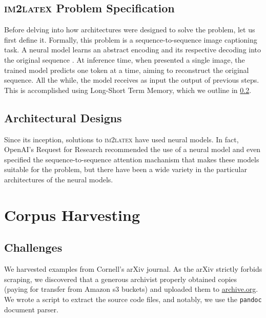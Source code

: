 \documentclass[12pt]{article}
\begin{document}
\cprotect
\subsection{\textsc{im2latex} Problem Specification}

Before delving into how architectures were designed to solve the problem, let us
first define it. Formally, this problem is a sequence-to-sequence image
captioning task. A neural model learns an abstract encoding and its respective
decoding into the original sequence \parencite[1]{deng2016you}. At inference
time, when presented a single image, the trained model predicts one token at a
time, aiming to reconstruct the original sequence. All the while, the model
receives as input the output of previous steps. This is accomplished using
Long-Short Term Memory, which we outline in \ref{netarch}.

\subsection{Architectural Designs}
\label{netarch}

Since its inception, solutions to \textsc{im2latex} have used neural models. In
fact, OpenAI's Request for Research recommended the use of a neural model and
even specified the sequence-to-sequence attention machanism that makes these
models suitable for the problem, but there have been a wide variety in the
particular architectures of the neural models.


\citeauthor{deng2016you}
\citeauthor{genthial2016image}
\citeauthor{wang2019translating}
\citeauthor{bender2019learning}

\section{Corpus Harvesting}


\subsection{Challenges}

We harvested examples from Cornell's arXiv journal. As the arXiv strictly
forbids scraping, we discovered that a generous archivist properly obtained
copies (paying for transfer from Amazon s3 buckets) and uploaded them to
\url{archive.org}. We wrote a script to extract the source code files, and
notably, we use the \texttt{pandoc} document parser.
\end{document}
